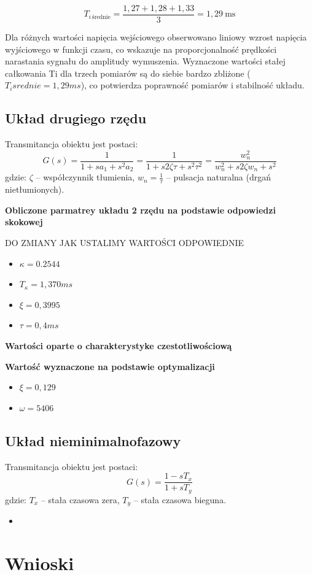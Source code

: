\documentclass[12pt,a4paper]{article}
\begin{document}
	\[
	T_{i\,\text{średnie}} = \frac{1,27 + 1,28 + 1,33}{3} = 1,29\ \text{ms}
	\]
	
	Dla różnych wartości napięcia wejściowego obserwowano liniowy wzrost napięcia wyjściowego w funkcji czasu, co wskazuje na proporcjonalność prędkości narastania sygnału do amplitudy wymuszenia. Wyznaczone wartości stałej całkowania Ti dla trzech pomiarów są do siebie bardzo zbliżone ($T_isrednie = 1,29 ms$), co potwierdza poprawność pomiarów i stabilność układu.
	
	
	\subsection{Układ drugiego rzędu}
	Transmitancja obiektu jest postaci:
	\begin{equation}
		G(s) = \frac{1}{1 + sa_1 + s^2a_2}
		= \frac{1}{1+s 2\zeta \tau + s^2 \tau^2}
		= \frac{w_n^2}{w_n^2 + s 2 \zeta w_n + s^2}
	\end{equation}
	gdzie: \(\zeta\) – współczynnik tłumienia, \(w_n = \frac{1}{\tau}\) – pulsacja naturalna (drgań nietłumionych).
	
		\textbf {Obliczone parmatrey układu 2 rzędu na podstawie odpowiedzi skokowej}
	
	DO ZMIANY JAK USTALIMY WARTOŚCI ODPOWIEDNIE
	
	\begin{itemize}
		\item $\kappa = 0.2544 $
		\item $T_\kappa = 1,370 ms$
		\item $\xi = 0,3995$
		\item $\tau = 0,4 ms$
	\end{itemize}
	
	\textbf{Wartości oparte o charakterystyke czestotliwościową}
	
	\textbf{Wartość wyznaczone na podstawie optymalizacji}
	\begin{itemize}
		\item $\xi = 0,129$
		\item $\omega = 5406$
	\end{itemize}
	
	\subsection{Układ nieminimalnofazowy}
	Transmitancja obiektu jest postaci:
	\begin{equation}
		G(s) = \frac{1-sT_x}{1+sT_y}
	\end{equation}
	gdzie: \(T_x\) – stała czasowa zera, \(T_y\) – stała czasowa bieguna.
	

	
	\begin{itemize}
		\item 
	\end{itemize}
	
	\section{Wnioski}
	
\end{document}
